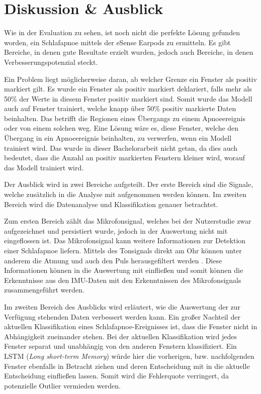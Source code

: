 
\chapter{Diskussion \& Ausblick}
\label{ch:FutureWork}
%

Wie in der Evaluation zu sehen, ist noch nicht die perfekte Lösung gefunden worden, ein Schlafapnoe mittels der eSense Earpods zu ermitteln.
Es gibt Bereiche, in denen gute Resultate erzielt wurden, jedoch auch Bereiche, in denen Verbesserungspotenzial steckt. 

Ein Problem liegt möglicherweise daran, ab welcher Grenze ein Fenster als positiv markiert gilt.
Es wurde ein Fenster als positiv markiert deklariert, falls mehr als 50\% der Werte in diesem Fenster positiv markiert sind.
Somit wurde das Modell auch auf Fenster trainiert, welche knapp über 50\% positiv markierte Daten beinhalten.
Das betrifft die Regionen eines Übergangs zu einem Apnoeereignis oder von einem solchen weg.
Eine Lösung wäre es, diese Fenster, welche den Übergang in ein Apnoeereignis beinhalten, zu verwerfen, wenn ein Modell trainiert wird. 
Das wurde in dieser Bachelorarbeit nicht getan, da dies auch bedeutet, dass die Anzahl an positiv markierten Fenstern kleiner wird, worauf das Modell trainiert wird.

Der Ausblick wird in zwei Bereiche aufgeteilt.
Der erste Bereich sind die Signale, welche zusätzlich in die Analyse mit aufgenommen werden können.
Im zweiten Bereich wird die Datenanalyse und Klassifikation genauer betrachtet.

Zum ersten Bereich zählt das Mikrofonsignal, welches bei der Nutzerstudie zwar aufgezeichnet und persistiert wurde, jedoch in der Auswertung nicht mit eingeflossen ist. 
Das Mikrofonsignal kann weitere Informationen zur Detektion einer Schlafapnoe liefern. 
Mittels des Tonsignals direkt am Ohr können unter anderem die Atmung und auch den Puls herausgefiltert werden \cite{nomaWearableDataAcquisition2005}.
Diese Informationen können in die Auswertung mit einfließen und somit können die Erkenntnisse aus den IMU-Daten mit den Erkenntnissen des Mikrofonsignals zusammengeführt werden.

Im zweiten Bereich des Ausblicks wird erläutert, wie die Auswertung der zur Verfügung stehenden Daten verbessert werden kann.
Ein großer Nachteil der aktuellen Klassifikation eines Schlafapnoe-Ereignisses ist, dass die Fenster nicht in Abhängigkeit zueinander stehen. 
Bei der aktuellen Klassifikation wird jedes Fenster separat und unabhängig von den anderen Fenstern klassifiziert.
Ein LSTM (\textit{Long short-term Memory}) würde hier die vorherigen, bzw. nachfolgenden Fenster ebenfalls in Betracht ziehen und deren Entscheidung mit in die aktuelle Entscheidung einfließen lassen. 
Somit wird die Fehlerquote verringert, da potenzielle Outlier vermieden werden.

